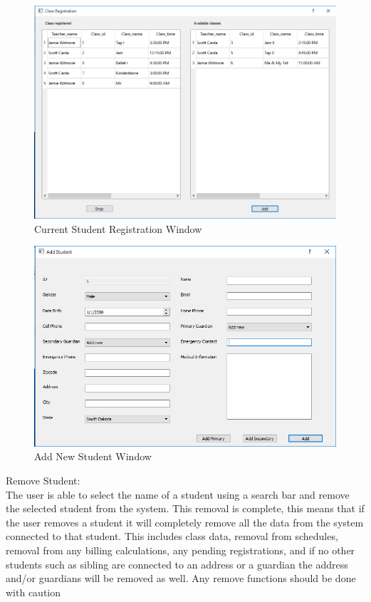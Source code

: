 \begin{figure}
  \includegraphics[width=\linewidth]{pics/userGuide/studentReg.png}
  \caption{Current Student Registration Window}
  \label{fig:User doc: Student Registration}
\end{figure}

\begin{figure}
  \includegraphics[width=\linewidth]{pics/userGuide/AddStudent.png}
  \caption{Add New Student Window}
  \label{fig:User doc: Add Student}
\end{figure}

Remove Student:\\
The user is able to select the name of a student using a search bar and remove the selected student from the system. This removal is complete, this means that if the user removes a student it will completely remove all the data from the system connected to that student. This includes class data, removal from schedules, removal from any billing calculations, any pending registrations, and if no other students such as sibling are connected to an address or a guardian the address and/or guardians will be removed as well. Any remove functions should be done with caution\\

